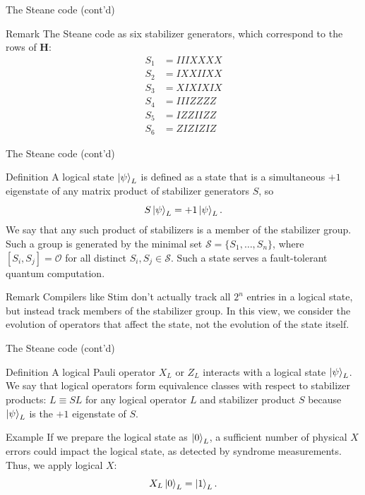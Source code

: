 \documentclass{beamer}
\renewcommand{\O}{\mathcal O}
\begin{document}
\begin{frame}{The Steane code (cont'd)}
	\begin{block}{Remark}
		The Steane code as six stabilizer generators, which correspond to the rows of $\mathbf H$:
		\begin{align*}
			S_1 &= I I I X X X X \\
			S_2 &= I X X I I X X \\
			S_3 &= X I X I X I X \\
			S_4 &= I I  I Z Z Z Z \\
			S_5 &= I Z Z I I Z Z \\
			S_6 &= Z I Z I Z I Z
		\end{align*}
	\end{block}

\end{frame}

\begin{frame}{The Steane code (cont'd)}
		\begin{block}{Definition}
		A logical state $\ket\psi_L$ is defined as a state that is a simultaneous $+1$ eigenstate of any matrix product of stabilizer generators $S$, so $$S\ket\psi_L = +1\ket\psi_L .$$ We say that any such product of stabilizers is a member of the stabilizer group. Such a group is generated by the minimal set $\mathcal S = \{ S_1, \ldots, S_n \}$, where $[S_i, S_j] = \O$ for all distinct $S_i,S_j \in \mathcal S$.  Such a state serves a fault-tolerant quantum computation.
	\end{block}
	\begin{block}{Remark}
		Compilers like Stim don't actually track all $2^n$ entries in a logical state, but instead track members of the stabilizer group. In this view, we consider the evolution of operators that affect the state, not the evolution of the state itself.
	\end{block}

\end{frame}

\begin{frame}{The Steane code (cont'd)}
	\begin{block}{Definition}
		A logical Pauli operator $X_L$ or $Z_L$ interacts with a logical state $\ket\psi_L$. We say that logical operators form equivalence classes with respect to stabilizer products: $L \equiv SL$ for any logical operator $L$ and stabilizer product $S$ because $\ket\psi_L$ is the $+1$ eigenstate of $S$.
	\end{block}
	\begin{block}{Example}
		If we prepare the logical state as $\ket 0 _L$, a sufficient number of physical $X$ errors could impact the logical state, as detected by syndrome measurements. Thus, we apply logical $X$: $$ X_L \ket 0 _L = \ket 1_L. $$
	\end{block}
\end{frame}
\end{document}

